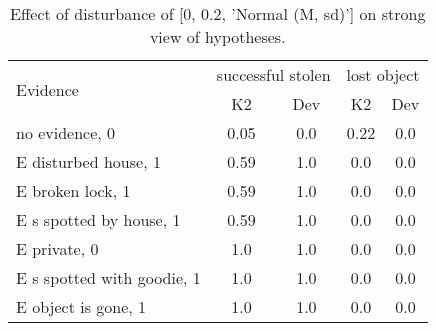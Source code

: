 \begin{table}\begin{tabular}{l|cc|cc}\toprule\multirow{2}{*}{Evidence} & \multicolumn{2}{c}{successful stolen}& \multicolumn{2}{c}{lost object}\\& {K2} & {Dev}& {K2} & {Dev}\\\midrule
no evidence, 0 & \cellcolor{Bittersweet}0.05&\cellcolor{Bittersweet}0.0&\cellcolor{Bittersweet}0.22&\cellcolor{Bittersweet}0.0\\E disturbed house, 1 & 0.59&1.0&\cellcolor{Bittersweet}0.0&\cellcolor{Bittersweet}0.0\\E broken lock, 1 & 0.59&1.0&\cellcolor{Bittersweet}0.0&\cellcolor{Bittersweet}0.0\\E s spotted by house, 1 & 0.59&1.0&\cellcolor{Bittersweet}0.0&\cellcolor{Bittersweet}0.0\\E private, 0 & \cellcolor{Bittersweet}1.0&\cellcolor{Bittersweet}1.0&\cellcolor{Bittersweet}0.0&\cellcolor{Bittersweet}0.0\\E s spotted with goodie, 1 & \cellcolor{Bittersweet}1.0&\cellcolor{Bittersweet}1.0&\cellcolor{Bittersweet}0.0&\cellcolor{Bittersweet}0.0\\E object is gone, 1 & \cellcolor{Bittersweet}1.0&\cellcolor{Bittersweet}1.0&\cellcolor{Bittersweet}0.0&\cellcolor{Bittersweet}0.0\\\bottomrule\end{tabular}\caption{Effect of disturbance of [0, 0.2, 'Normal (M, sd)'] on strong view of hypotheses.}\end{table}